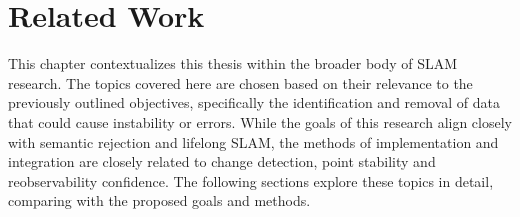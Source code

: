 \section{Related Work}
\label{sec:related_work}

This chapter contextualizes this thesis within the broader body of SLAM research. The topics covered here are chosen based on their relevance to the previously outlined objectives, specifically the identification and removal of data that could cause instability or errors. While the goals of this research align closely with semantic rejection and lifelong SLAM, the methods of implementation and integration are  closely related to change detection, point stability and reobservability confidence. The following sections explore these topics in detail, comparing with the proposed goals and methods.

% 